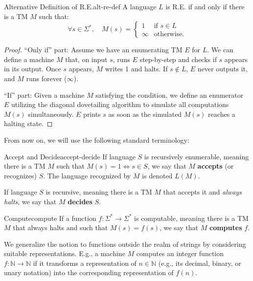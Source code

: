 \begin{theorem}{Alternative Definition of R.E.}{alt-re-def}
    A language \(L\) is R.E. if and only if there is a TM \(M\) such that:
    \[
    \forall s \in \Sigma^*, \quad M(s) = 
    \begin{cases}
        1 & \text{if } s \in L \\
        \infty & \text{otherwise.}
    \end{cases}
    \]
    \begin{proof}
        ``Only if'' part: Assume we have an enumerating TM \(E\) for \(L\). We can define a machine \(M\) that, on input \(s\), runs \(E\) step-by-step and checks if \(s\) appears in its output. Once \(s\) appears, \(M\) writes 1 and halts. If \(s \notin L\), \(E\) never outputs it, and \(M\) runs forever (\(\infty\)).
        
        ``If'' part: Given a machine \(M\) satisfying the condition, we define an enumerator \(E\) utilizing the diagonal dovetailing algorithm to simulate all computations \(M(s)\) simultaneously. \(E\) prints \(s\) as soon as the simulated \(M(s)\) reaches a halting state.
    \end{proof}
\end{theorem}

\noindent From now on, we will use the following standard terminology:

\begin{definition}{Accept and Decide}{accept-decide}
    If language \(S\) is recursively enumerable, meaning there is a TM \(M\) such that \(M(s) = 1 \iff s \in S\), we say that \(M\) \textbf{accepts} (or recognizes) \(S\). The language recognized by \(M\) is denoted \(L(M)\).
    
    If language \(S\) is recursive, meaning there is a TM \(M\) that accepts it and \textit{always halts}, we say that \(M\) \textbf{decides} \(S\).
\end{definition}

\begin{definition}{Compute}{compute}
    If a function \(f : \Sigma^* \rightarrow \Sigma^*\) is computable, meaning there is a TM \(M\) that always halts and such that \(M(s) = f(s)\), we say that \(M\) \textbf{computes} \(f\).
\end{definition}

\noindent We generalize the notion to functions outside the realm of strings by considering suitable representations. E.g., a machine \(M\) computes an integer function \(f : \mathbb{N} \rightarrow \mathbb{N}\) if it transforms a representation of \(n \in \mathbb{N}\) (e.g., its decimal, binary, or unary notation) into the corresponding representation of \(f(n)\).

